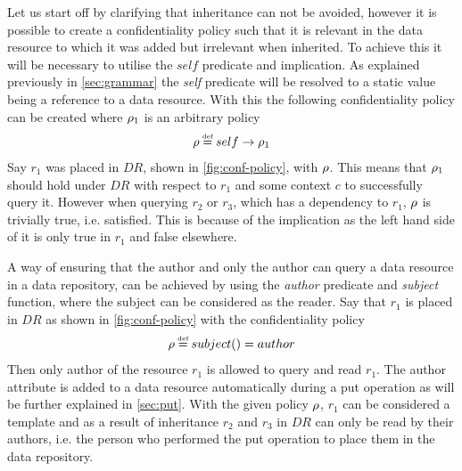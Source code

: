 \begin{example}
Let us start off by clarifying that inheritance can not be avoided, however it is possible to create a confidentiality policy such that it is relevant in the data resource to which it was added but irrelevant when inherited. To achieve this it will be necessary to utilise the $self$ predicate and implication. As explained previously in \autoref{sec:grammar} the \emph{self} predicate will be resolved to a static value being a reference to a data resource. With this the following confidentiality policy can be created where $\rho_1$ is an arbitrary policy 
\begin{align*}
    \conf \eqdef self \imply \conf_1
\end{align*}
Say $r_1$ was placed in $DR$, shown in \autoref{fig:conf-policy}, with $\rho$. This means that $\rho_1$ should hold under $DR$ with respect to $r_1$ and some context $c$ to successfully query it. However when querying $r_2$ or $r_3$, which has a dependency to $r_1$, $\rho$ is trivially true, i.e. satisfied. This is because of the implication as the left hand side of it is only true in $r_1$ and false elsewhere.
\end{example}

\begin{example}\label{ex:conf-reader-author}
A way of ensuring that the author and only the author can query a data resource in a data repository, can be achieved by using the \emph{author} predicate and \emph{subject} function, where the subject can be considered as the reader. Say that $r_1$ is placed in $DR$ as shown in \autoref{fig:conf-policy} with the confidentiality policy 
\begin{align*}
    \conf \eqdef subject() = author
\end{align*}
Then only author of the resource $r_1$ is allowed to query and read $r_1$. The author attribute is added to a data resource automatically during a put operation as will be further explained in \autoref{sec:put}. With the given policy $\rho$, $r_1$ can be considered a template and as a result of inheritance $r_2$ and $r_3$ in $DR$ can only be read by their authors, i.e. the person who performed the put operation to place them in the data repository.
\end{example}

